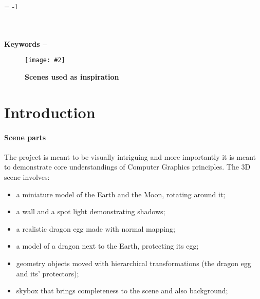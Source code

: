 \documentclass[10pt, a4paper]{article}
\title{\mytitle}
\author{\myauthor\hspace{1em}\\\contact\\Edinburgh Napier University\hspace{0.5em}-\hspace{0.5em}\mymodule}
\date{}
\newcommand{\figuremacro}[5]{
    \begin{figure}[#1]
        \centering
        \texttt{[image: \#2]}
        \caption[#3]{\textbf{#3}#4}
        \label{fig:#2}
    \end{figure}
}
\begin{document}
	
	
	\hyphenchar\font = -1
	
	\maketitle
	\begin{abstract}
		 The aim of this project is to create a realistic 3D scene, rendered in real-time. The project is inspired by the series \textit{Games of Thrones}\cite{dragons} (see \textbf{Figure {\ref{fig:inspiration}}}) and previous years projects found on the games website\cite{gamesWebsite} of Napier University. A wide variety of graphics techniques were used to create the 3D scene, from multiple lights and light types to shadowing, material shading and transform hierarchy. This report covers how the scene was implemented and what future work is considered.
	\end{abstract}
	\\\\
	\textbf{Keywords -- }{\mykeywords}
	\figuremacro{h}{inspiration}{Scenes used as inspiration}{ }{1.0}	
    
	\section{Introduction}
    \paragraph{Scene parts} The project is meant to be visually intriguing and more importantly it is meant to demonstrate core understandings of Computer Graphics principles. The 3D scene involves:   
    \begin{itemize}
    	\item a miniature model of the Earth and the Moon, rotating around it;
    	\item a wall and a spot light demonstrating shadows;
    	\item a realistic dragon egg made with normal mapping;
    	\item a model of a dragon next to the Earth, protecting its egg;
    	\item geometry objects moved with hierarchical transformations (the dragon egg and its' protectors);
    	\item skybox that brings completeness to the scene and also background;
    \end{itemize}
    
\end{document}
